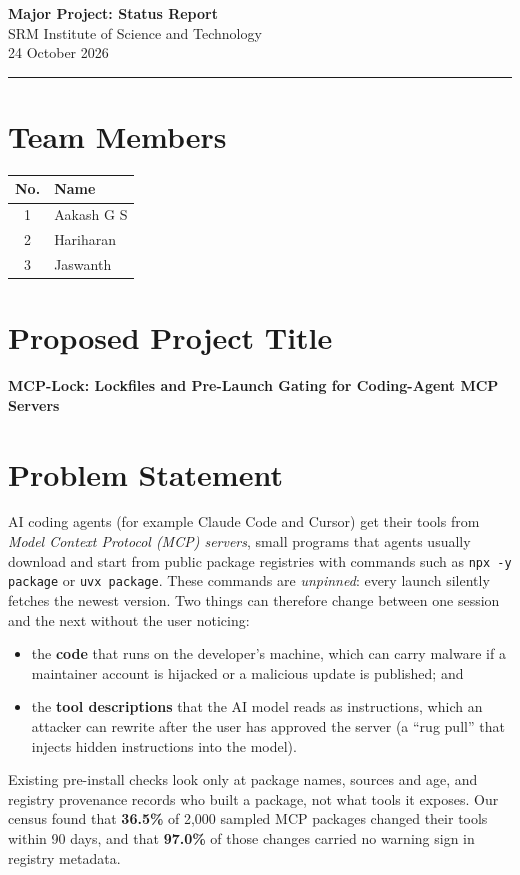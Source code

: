 \documentclass[11pt,a4paper]{article}
\begin{document}
\begin{center}
  {\LARGE\bfseries\color{accent} Major Project: Status Report}\\[0.5em]
  {\large SRM Institute of Science and Technology}\\[0.3em]
  {\normalsize 24 October 2026}
\end{center}
\vspace{0.4em}
\hrule
\vspace{0.6em}

\section{Team Members}
\begin{tabularx}{\textwidth}{@{}cX@{}}
\toprule
\textbf{No.} & \textbf{Name} \\
\midrule
1 & Aakash G S \\
2 & Hariharan \\
3 & Jaswanth \\
\bottomrule
\end{tabularx}

\section{Proposed Project Title}
\textbf{MCP-Lock: Lockfiles and Pre-Launch Gating for Coding-Agent MCP Servers}

\section{Problem Statement}
AI coding agents (for example Claude Code and Cursor) get their tools from \emph{Model Context Protocol (MCP)
servers}, small programs that agents usually download and start from public package registries with commands such
as \texttt{npx -y package} or \texttt{uvx package}. These commands are \emph{unpinned}: every launch silently fetches
the newest version. Two things can therefore change between one session and the next without the user noticing:
\begin{itemize}
  \item the \textbf{code} that runs on the developer's machine, which can carry malware if a maintainer account is
        hijacked or a malicious update is published; and
  \item the \textbf{tool descriptions} that the AI model reads as instructions, which an attacker can rewrite after
        the user has approved the server (a ``rug pull'' that injects hidden instructions into the model).
\end{itemize}
Existing pre-install checks look only at package names, sources and age, and registry provenance records who built
a package, not what tools it exposes. Our census found that \textbf{36.5\%} of 2,000 sampled MCP packages changed
their tools within 90 days, and that \textbf{97.0\%} of those changes carried no warning sign in registry metadata.
\end{document}
